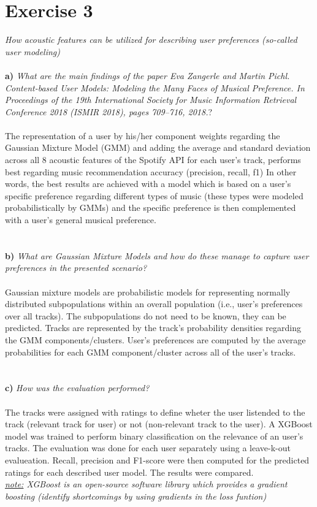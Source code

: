 \documentclass{article}
\begin{document}
\section{Exercise 3}
\textit{How acoustic features can be utilized for describing user preferences (so-called user modeling)}\\
\\
\textbf{a)} \textit{What are the main findings of the paper Eva Zangerle and Martin Pichl. Content-based User Models: Modeling the Many Faces of Musical Preference. In Proceedings of the 19th International Society for Music Information Retrieval Conference 2018 (ISMIR 2018), pages 709–716, 2018.}?\\
\\
The representation of a user by his/her component weights regarding the Gaussian Mixture Model (GMM) and adding the average and standard deviation across all 8 acoustic features of the Spotify API for each user's track, performs best regarding music recommendation accuracy (precision, recall, f1)
In other words, the best results are achieved with a model which is based on a user’s specific preference regarding different types of music (these types were modeled probabilistically by GMMs) and the specific preference is then complemented with a user’s general musical preference.\\
\\
\\
\textbf{b)} \textit{What are Gaussian Mixture Models and how do these manage to capture user preferences in the presented scenario?}\\
\\
Gaussian mixture models are probabilistic models for representing normally distributed subpopulations within an overall population (i.e., user's preferences over all tracks). The subpopulations do not need to be known, they can be predicted.
Tracks are represented by the track's probability densities regarding the GMM components/clusters.
User's preferences are computed by the average probabilities for each GMM component/cluster across all of the user's tracks.\\
\\
\\
\textbf{c)} \textit{How was the evaluation performed?}\\
\\
The tracks were assigned with ratings to define wheter the user listended to the track (relevant track for user) or not (non-relevant track to the user).
A XGBoost model was trained to perform binary classification on the relevance of an user's tracks.
The evaluation was done for each user separately using a leave-k-out evalueation.
Recall, precision and F1-score were then computed for the predicted ratings for each described user model. The results were compared.\\
\textit{\underline{note:} XGBoost is an open-source software library which provides a gradient boosting (identify shortcomings by using gradients in the loss funtion)}
\end{document}
